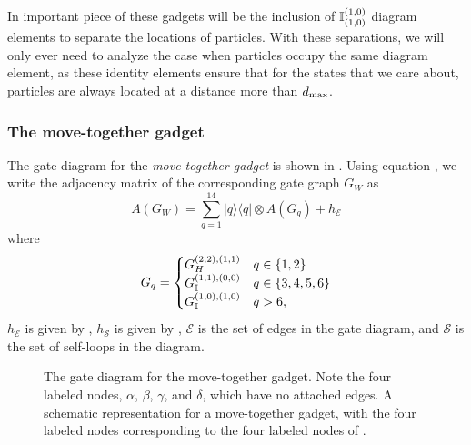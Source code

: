 \documentclass[../thesis-main/thesis-main]{subfiles}
\begin{document}
In important piece of these gadgets will be the inclusion of $\mathbb{I}_{(1,0)}^{(1,0)}$ diagram elements to separate the locations of particles.  With these separations, we will only ever need to analyze the case when particles occupy the same diagram element, as these identity elements ensure that for the states that we care about, particles are always located at a distance more than $d_{\text{max}}$.

\subsubsection{The move-together gadget}



The gate diagram for the \emph{move-together gadget} is shown in . Using equation , we write the adjacency matrix of the corresponding gate graph $G_W$ as 
\begin{equation}
A(G_W)=\sum_{q=1}^{14}|q\rangle\langle q|\otimes A(G_q)+h_{\mathcal{E}}\label{eq:move_together_adj}
\end{equation}
where
\begin{equation}
  G_q = \begin{cases}
    G_H^{(2,2),(1,1)} & q \in \{1,2\}\\
    G_{\mathbb{I}}^{(1,1),(0,0)} & q\in \{3,4,5,6\}\\
    G_{\mathbb{I}}^{(1,0),(1,0)} & q > 6,
  \end{cases}
\end{equation}
$h_{\mathcal{E}}$ is given by , $h_{\mathcal{S}}$ is given by ,  $\mathcal{E}$ is the set of edges in the gate diagram, and $\mathcal{S}$ is the set of self-loops in the diagram.

\begin{figure}
\centering 
{}
\hspace{1cm}
\caption[Move-together gadget]{ The gate diagram for the move-together gadget.  Note the four labeled nodes, $\alpha$, $\beta$, $\gamma$, and $\delta$, which have no attached edges.   A schematic representation for a move-together gadget, with the four labeled nodes corresponding to the four labeled nodes of . \label{fig:W_gadget}} 
\end{figure}
\end{document}
